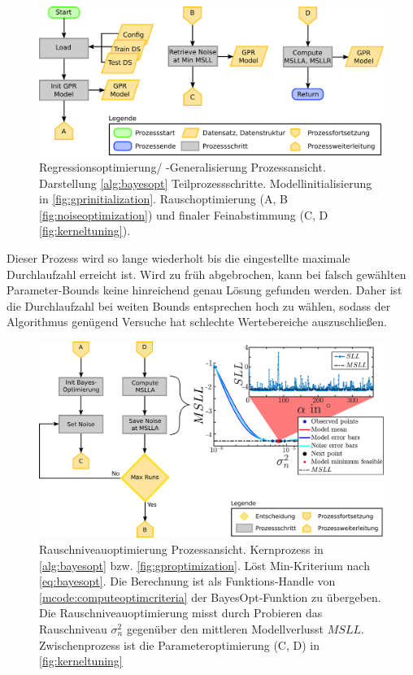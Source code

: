 \clearpage

\begin{figure}[th!]
	\centering
	\includegraphics[width=.7\linewidth]{chapters/images/3-SW-E-OExp/GPR_Optimization}
	\caption[Regressionsoptimierung/ -Generalisierung Prozessansicht]{Regressionsoptimierung/ -Generalisierung Prozessansicht. Darstellung \autoref{alg:bayesopt} Teilprozessschritte. Modellinitialisierung in \autoref{fig:gprinitialization}. Rauschoptimierung (A, B \autoref{fig:noiseoptimization}) und finaler Feinabstimmung (C, D \autoref{fig:kerneltuning}).}
	\label{fig:gproptimization}
\end{figure}


Dieser Prozess wird so lange wiederholt bis die eingestellte maximale Durchlaufzahl erreicht ist. Wird zu früh abgebrochen, kann bei falsch gewählten Parameter-Bounds keine hinreichend genau Lösung gefunden werden. Daher ist die Durchlaufzahl bei weiten Bounds entsprechen hoch zu wählen, sodass der Algorithmus genügend Versuche hat schlechte Wertebereiche auszuschließen.


\vspace{2mm}
\begin{figure}[bh!]
	\centering
	\includegraphics[width=0.75\linewidth]{chapters/images/3-SW-E-OExp/Noise_Optimization}
	\caption[Rauschniveauoptimierung Prozessansicht]{Rauschniveauoptimierung Prozessansicht. Kernprozess in \autoref{alg:bayesopt} bzw. \autoref{fig:gproptimization}. Löst Min-Kriterium nach \autoref{eq:bayesopt}. Die Berechnung ist als Funktions-Handle von \autoref{mcode:computeoptimcriteria} der BayesOpt-Funktion zu übergeben. Die Rauschniveauoptimierung misst durch Probieren das Rauschniveau $\sigma_n^2$ gegenüber den mittleren Modellverlusst $MSLL$. Zwischenprozess ist die Parameteroptimierung (C, D) in \autoref{fig:kerneltuning}}
	\label{fig:noiseoptimization}
\end{figure}



